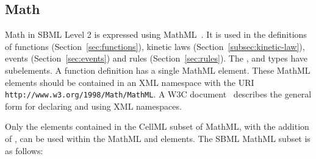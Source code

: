 \documentclass[10pt]{cekarticle}
\begin{document}
\subsection{Math}
\label{sec:formulas}

Math in SBML Level 2 is expressed using MathML~\citep{w3c:2000b}.
It is used in the definitions of functions
(Section~\ref{sec:functions}), kinetic laws
(Section~\ref{subsec:kinetic-law}), events
(Section~\ref{sec:events}) and rules (Section~\ref{sec:rules}).
The ,  and  types have
 subelements.  A function definition has a single
MathML  element. These MathML elements should be
contained in an XML namespace with the URI
\texttt{http://www.w3.org/1998/Math/MathML}.  A W3C
document~\citep{bray:1999} describes the general form for
declaring and using XML namespaces.

Only the elements contained in the CellML subset of MathML, with
the addition of , can be used within the MathML
 and  elements. The SBML MathML subset
is as follows:
\end{document}
